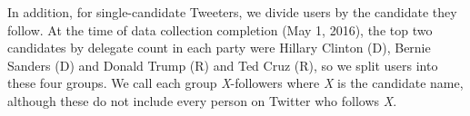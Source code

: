 In addition, for single-candidate Tweeters, we divide users by the candidate they follow. At the time of data collection completion (May 1, 2016), the top two candidates by delegate count in each party were Hillary Clinton (D), Bernie Sanders (D) and Donald Trump (R) and Ted Cruz (R), so we split users into these four groups. We call each group \emph{X}-followers where \emph{X} is the candidate name, although these do not include every person on Twitter who follows \emph{X}.  
 

